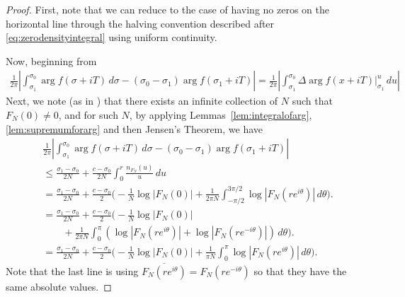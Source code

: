 \documentclass[10pt,english,letter, reqno]{amsart}
\theoremstyle{plain}
\theoremstyle{definition}
\begin{document}
\begin{proof}
First, note that we can reduce to the case of having no zeros on the horizontal line through the halving convention described after \eqref{eq:zerodensityintegral} using uniform continuity. 

Now, beginning from
\begin{align*}
 \frac{1}{2\pi}\left|\int_{\sigma_1}^{\sigma_0} \arg f(\sigma+iT)\,d\sigma - (\sigma_0-\sigma_1)\arg f(\sigma_1+iT)\right|=
\frac{1}{2\pi}\left|\int_{\sigma_1}^{\sigma_0} \Delta\arg f( x + i T)|_{\sigma_1}^u\,du\right|
\end{align*}
Next, we note (as in \cite[Lemma~3.3]{HasanalizadeShenWong2022}) that there exists an infinite collection of $N$ such that $F_N(0)\neq 0$, and for such $N$,
by applying Lemmas~\ref{lem:integralofarg}, \ref{lem:supremumforarg} and then Jensen's Theorem, we have
\begin{align*}
& \frac{1}{2\pi}\left|\int_{\sigma_1}^{\sigma_0} \arg f(\sigma+iT)\,d\sigma - (\sigma_0-\sigma_1)\arg f(\sigma_1+iT)\right|\\
&\leq \frac{\sigma_1-\sigma_0}{2N} + \frac{c-\sigma_0}{2N}
     \int_{0}^{r} \frac{ n_{F_N}(u)}{u}\,du\\
&=\frac{\sigma_1-\sigma_0}{2N} + \frac{c-\sigma_0}{2}\Biggl(
-\frac{1}{N}\log|F_N(0)|+   \frac{1}{2\pi N}\int_{-\pi/2}^{3\pi/2}\log|F_N(re^{i\theta})|\,d\theta \Biggr).\\
&=\frac{\sigma_1-\sigma_0}{2N} + \frac{c-\sigma_0}{2}\Biggl(
-\frac{1}{N}\log|F_N(0)|
\\&\qquad +   \frac{1}{2\pi N}\int_{0}^{\pi}\left(\log|F_N(re^{i\theta})|+\log|F_N(re^{-i\theta})|\right)\,d\theta \Biggr).\\
&=\frac{\sigma_1-\sigma_0}{2N} + \frac{c-\sigma_0}{2}\Biggl(
-\frac{1}{N}\log|F_N(0)| +   \frac{1}{\pi N}\int_{0}^{\pi}\log|F_N(re^{i\theta})|\,d\theta \Biggr).
\end{align*}
Note that the last line is using $\overline{F_N(re^{i\theta})} = F_N(re^{-i\theta})$ so that they have the same absolute values.


\end{proof}
\end{document}
